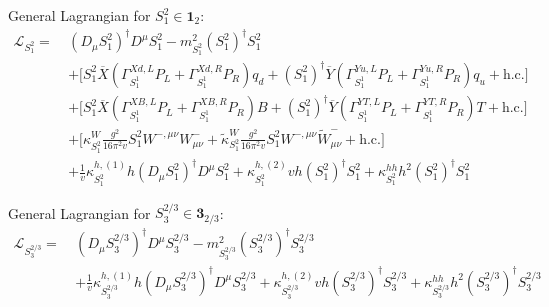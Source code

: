 \documentclass[preprintnumbers,nofootinbib,showpacs,eqsecnum,pre,12pt]{revtex4-1}
\newcommand{\adj}[1]{\overline{#1}}
\newcommand{\hc}{\text{h.c.}}
\begin{document}
\noindent
General Lagrangian for $S_1^2\in \mathbf 1_2$:
\begin{align}\label{eq:LS12}
	\mathcal L_{S_1^2} =~& (D_\mu S_1^2)^\dagger D^\mu S_1^2 - m^2_{S_1^2} (S_{1}^2)^\dagger S_1^2 \nonumber\\
	&+ \Big[ S_1^2 \adj X \left( \Gamma_{S_1^1}^{Xd,L} P_L + \Gamma_{S_1^1}^{Xd,R} P_R \right) q_d + (S_1^2)^\dagger \adj Y \left( \Gamma_{S_1^1}^{Yu,L} P_L + \Gamma_{S_1^1}^{Yu,R} P_R \right) q_u + \hc \Big] \nonumber\\
	&+ \Big[ S_1^2 \adj X \left( \Gamma_{S_1^1}^{XB,L} P_L + \Gamma_{S_1^1}^{XB,R} P_R \right) B + (S_1^2)^\dagger \adj Y \left( \Gamma_{S_1^1}^{YT,L} P_L + \Gamma_{S_1^1}^{YT,R} P_R \right) T + \hc \Big] \nonumber\\
	&+ \Big[ \kappa_{S_1^2}^W \frac{g^2}{16 \pi^2 v} S_1^2 W^{-,\mu\nu} W^-_{\mu\nu} + \tilde\kappa_{S_1^2}^W \frac{g^2}{16 \pi^2 v} S_1^2 W^{-,\mu\nu} \tilde W^-_{\mu\nu} + \hc \Big] \nonumber\\
	&+ \frac 1v \kappa_{S_1^2}^{h,(1)} h (D_\mu S_1^2)^\dagger D^\mu S_1^2 + \kappa_{S_1^2}^{h,(2)} vh (S_1^2)^\dagger S_1^2 + \kappa_{S_1^2} ^{hh} h^2 (S_1^2)^\dagger S_1^2 
\end{align}



\noindent
General Lagrangian for $S_3^{2/3}\in \mathbf 3_{2/3}$:
	\begin{align}\label{eq:LS323}
		\mathcal L_{S_3^{2/3}} =~& (D_\mu S_3^{2/3})^\dagger D^\mu S_3^{2/3} - m^2_{S_3^{2/3}} (S_3^{2/3})^\dagger S_3^{2/3}\nonumber \\
		&+ \frac 1v \kappa_{S_3^{2/3}}^{h,(1)} h (D_\mu S_3^{2/3})^\dagger D^\mu S_3^{2/3} + \kappa_{S_3^{2/3}}^{h,(2)} vh (S_3^{2/3})^\dagger S_3^{2/3} + \kappa_{S_3^{2/3}} ^{hh} h^2 (S_3^{2/3})^\dagger S_3^{2/3} 
	\end{align}
\end{document}
